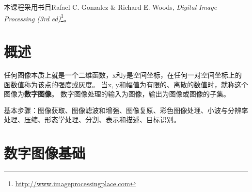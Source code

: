 
本课程采用书目Rafael C. Gonzalez \& Richard E. Woods, \emph{Digital Image Processing (3rd ed)}\footnote{\url{http://www.imageprocessingplace.com}}。

\section{概述} %
任何图像本质上就是一个二维函数，x和y是空间坐标，在任何一对空间坐标上的函数值称为该点的强度或灰度。
当x, y和幅值为有限的、离散的数值时，就称这个图像为\textbf{数字图像}。
数字图像处理的输入为图像，输出为图像或图像的子集。

基本步骤：图像获取、图像滤波和增强、图像复原、彩色图像处理、小波与分辨率处理、压缩、形态学处理、分割、表示和描述、目标识别。

\section{数字图像基础} %
